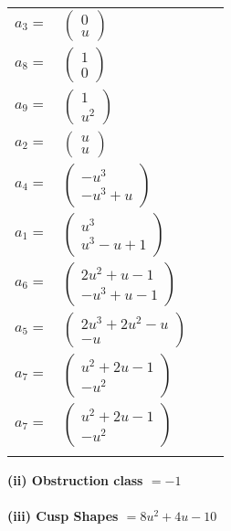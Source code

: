 \documentclass[1p]{elsarticle_modified}
\theoremstyle{definition}
\begin{document}
\begin{tabular}{m{7pt} m{180pt} m{7pt} m{180pt} }
\flushright $a_{3}=$&$\begin{pmatrix}0\\u\end{pmatrix}$ \\
\flushright $a_{8}=$&$\begin{pmatrix}1\\0\end{pmatrix}$ \\
\flushright $a_{9}=$&$\begin{pmatrix}1\\u^2\end{pmatrix}$ \\
\flushright $a_{2}=$&$\begin{pmatrix}u\\u\end{pmatrix}$ \\
\flushright $a_{4}=$&$\begin{pmatrix}- u^3\\- u^3+u\end{pmatrix}$ \\
\flushright $a_{1}=$&$\begin{pmatrix}u^3\\u^3- u+1\end{pmatrix}$ \\
\flushright $a_{6}=$&$\begin{pmatrix}2 u^2+u-1\\- u^3+u-1\end{pmatrix}$ \\
\flushright $a_{5}=$&$\begin{pmatrix}2 u^3+2 u^2- u\\- u\end{pmatrix}$ \\
\flushright $a_{7}=$&$\begin{pmatrix}u^2+2 u-1\\- u^2\end{pmatrix}$\\ \flushright $a_{7}=$&$\begin{pmatrix}u^2+2 u-1\\- u^2\end{pmatrix}$\\&\end{tabular}
\flushleft \textbf{(ii) Obstruction class $= -1$}\\~\\
\flushleft \textbf{(iii) Cusp Shapes $= 8 u^2+4 u-10$}\\~\\
\end{document}
